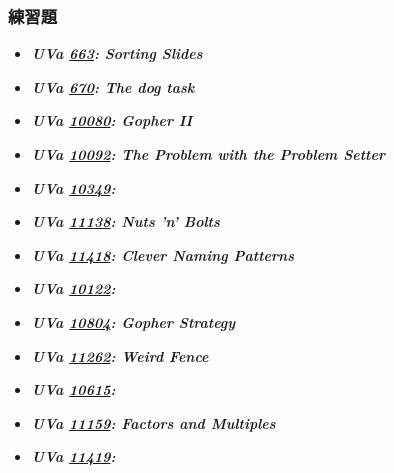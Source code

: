 \subsubsection*{練習題}
\begin{itemize}[label={\Checkmark}]
\item \textbf{\textit{UVa \href{http://uva.onlinejudge.org/external/6/663.html}{663}: Sorting Slides}}\\

\item \textbf{\textit{UVa \href{http://uva.onlinejudge.org/external/6/670.html}{670}: The dog task}}\\

\item \textbf{\textit{UVa \href{http://uva.onlinejudge.org/external/100/10080.html}{10080}: Gopher II}}\\

\item \textbf{\textit{UVa \href{http://uva.onlinejudge.org/external/100/10092.html}{10092}: The Problem with the Problem Setter}}\\

\item \textbf{\textit{UVa \href{http://uva.onlinejudge.org/external/103/10349.html}{10349}: }}\\

\item \textbf{\textit{UVa \href{http://uva.onlinejudge.org/external/111/11138.html}{11138}: Nuts 'n' Bolts}}\\

\item \textbf{\textit{UVa \href{http://uva.onlinejudge.org/external/114/11418.html}{11418}: Clever Naming Patterns}}\\

\item \textbf{\textit{UVa \href{http://uva.onlinejudge.org/external/101/10122.html}{10122}: }}\\

\item \textbf{\textit{UVa \href{http://uva.onlinejudge.org/external/108/10804.html}{10804}: Gopher Strategy}}\\

\item \textbf{\textit{UVa \href{http://uva.onlinejudge.org/external/112/11262.html}{11262}: Weird Fence}}\\

\item \textbf{\textit{UVa \href{http://uva.onlinejudge.org/external/106/10615.html}{10615}: }}\\

\item \textbf{\textit{UVa \href{http://uva.onlinejudge.org/external/111/11159.html}{11159}: Factors and Multiples}}\\

\item \textbf{\textit{UVa \href{http://uva.onlinejudge.org/external/114/11419.html}{11419}: }}\\

\end{itemize}